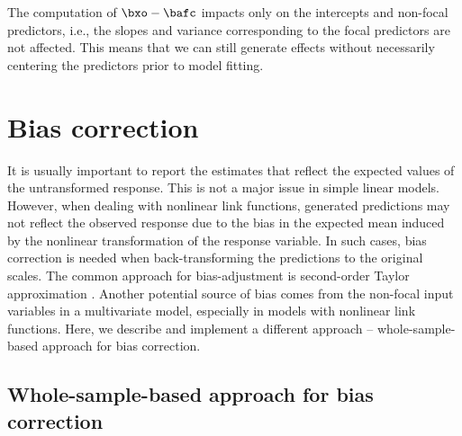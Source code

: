 The computation of $\bxo - \bafc$ impacts only on the intercepts and non-focal predictors, i.e., the slopes and variance corresponding to the focal predictors are not affected. This means that we can still generate effects without necessarily centering the predictors prior to model fitting.


\section{Bias correction}

It is usually important to report the estimates that reflect the expected values of the untransformed response. This is not a major issue in simple linear models. However, when dealing with nonlinear link functions,  generated predictions may not reflect the observed response due to the bias in the expected mean induced by the nonlinear transformation of the response variable. In such cases, bias correction is needed when back-transforming the predictions to the original scales. The common approach for bias-adjustment is second-order Taylor approximation \citep{lenth2018package, duursma2003bias}. Another potential source of bias comes from the non-focal input variables in a multivariate model, especially in models with nonlinear link functions. Here, we describe and implement a different approach -- whole-sample-based approach for bias correction.

\subsection{Whole-sample-based approach for bias correction}

